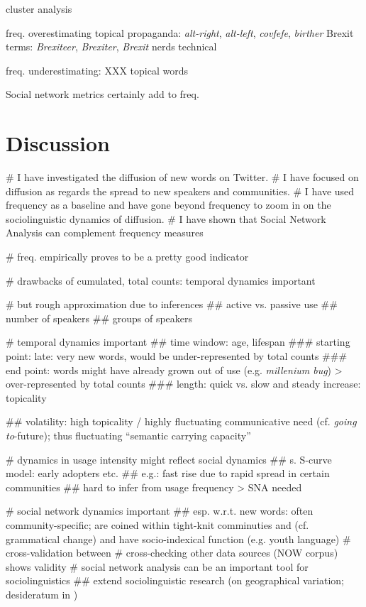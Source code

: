 \documentclass[
  a4paper,
  abstract=on,
  captions=tableabove
  ]{scrartcl}
\begin{document}
  cluster analysis

  freq. overestimating
  topical
  propaganda: \emph{alt-right}, \emph{alt-left}, \emph{covfefe}, \emph{birther}
  Brexit terms: \emph{Brexiteer}, \emph{Brexiter}, \emph{Brexit}
  nerds
  technical

  freq. underestimating: XXX
  topical words

  Social network metrics certainly add to freq.

\section{Discussion}
  \label{sec:discussion}


    \begin{qitem}
      # I have investigated the diffusion of new words on Twitter.
      # I have focused on diffusion as regards the spread to new speakers and communities.
      # I have used frequency as a baseline and have gone beyond frequency to zoom in on the sociolinguistic dynamics of diffusion.
      # I have shown that Social Network Analysis can complement frequency measures
    \end{qitem}


    \begin{qitem}
      # freq. empirically proves to be a pretty good indicator

      # drawbacks of cumulated, total counts: temporal dynamics important

      # but rough approximation due to inferences
        ## active vs. passive use
        ## number of speakers
        ## groups of speakers

      # temporal dynamics important
        ## time window: age, lifespan
          ### starting point: late: very new words, would be under-represented by total counts
          ### end point: words might have already grown out of use (e.g. \emph{millenium bug}) > over-represented by total counts
          ### length: quick vs. slow and steady increase: topicality

        ## volatility: high topicality / highly fluctuating communicative need (cf. \emph{going to}-future); thus fluctuating ``semantic carrying capacity''~\parencite{Grieve2018MappingLexical}

      # dynamics in usage intensity might reflect social dynamics
        ## s. S-curve model: early adopters etc.
        ## e.g.: fast rise due to rapid spread in certain communities
        ## hard to infer from usage frequency > SNA needed

      # social network dynamics important
        ## esp. w.r.t. new words: often community-specific; are coined within tight-knit comminuties and (cf. grammatical change) and have socio-indexical function (e.g. youth language)
      # cross-validation between
      # cross-checking other data sources (NOW corpus) shows validity
      # social network analysis can be an important tool for sociolinguistics
        ## extend sociolinguistic research (on geographical variation; desideratum in \cite{Grieve2019MappingLexical})
    \end{qitem}
\end{document}
